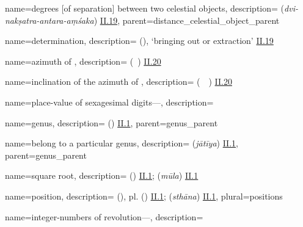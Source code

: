 {
        name={degrees [of separation] between two celestial objects},
        description={ (\textit{dvi-nakṣatra-antara-aṃśaka}) \hyperlink{Sii19}{II.19}},
        parent={distance_celestial_object_parent}
}

{
        name={determination},
        description={ (\istikhraj), \lit `bringing out or extraction' \hyperlink{Pii19}{II.19}}
}

{
        name={azimuth of \qibla},
        description={ (\samt\idafaconsonant\ \qibla) \hyperlink{Pii20}{II.20}}
}


{
        name={inclination of the azimuth of \qibla},
        description={ (\inhiraf\idafaconsonant\ \samt\idafaconsonant\ \qibla) \hyperlink{Pii20}{II.20}}
}


{
        name={place-value of sexagesimal digits---},
        description={\phantom{x}\nopagebreak}
}

{
        name={genus},
        description={ (\jins) \hyperlink{Pii1}{II.1}},
        parent={genus_parent}
}

{
        name={belong to a particular genus},
        description={ (\textit{jātīya}) \hyperlink{Sii1}{II.1}},
        parent={genus_parent}
}


{
        name={square root},
        description={ (\jadr) \hyperlink{Pii1}{II.1};  (\textit{mūla}) \hyperlink{Sii1}{II.1}}
}

{
        name={position},
        description={ (\martaba), pl.\thinspace {} (\maratib) \hyperlink{Pii1}{II.1};   (\textit{sthāna}) \hyperlink{Sii1}{II.1}},
        plural={positions}        
}

{
        name={integer-numbers of revolution---},
        description={\phantom{x}\nopagebreak}
}

